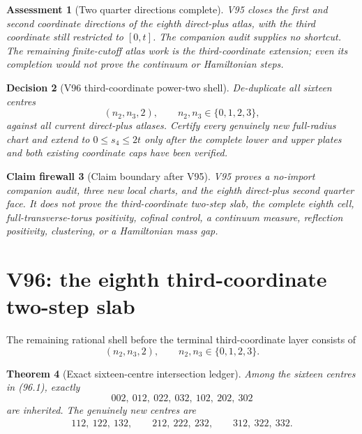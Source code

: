 \documentclass[11pt,oneside]{article}
\newtheorem{theorem}{Theorem}[section]
\newtheorem{assessment}[theorem]{Assessment}
\newtheorem{firewall}[theorem]{Claim firewall}
\newtheorem{decision}[theorem]{Decision}
\theoremstyle{definition}
\theoremstyle{remark}
\begin{document}
\begin{assessment}[Two quarter directions complete]
\label{ass:newv95}
V95 closes the first and second coordinate directions of the eighth
direct-plus atlas, with the third coordinate still restricted to
\([0,t]\).  The companion audit supplies no shortcut.  The remaining
finite-cutoff atlas work is the third-coordinate extension; even its
completion would not prove the continuum or Hamiltonian steps.
\end{assessment}

\begin{decision}[V96 third-coordinate power-two shell]
\label{dec:newv95-next}
De-duplicate all sixteen centres
\[
 (n_2,n_3,2),\qquad n_2,n_3\in\{0,1,2,3\},          \tag{95.12}
\]
against all current direct-plus atlases.  Certify every genuinely
new full-radius chart and extend to \(0\leq s_4\leq2t\) only after
the complete lower and upper plates and both existing coordinate
caps have been verified.
\end{decision}

\begin{firewall}[Claim boundary after V95]
\label{fire:newv95-final}
V95 proves a no-import companion audit, three new local charts, and
the eighth direct-plus second quarter face.  It does not prove the
third-coordinate two-step slab, the complete eighth cell,
full-transverse-torus positivity, cofinal control, a continuum
measure, reflection positivity, clustering, or a Hamiltonian mass
gap.
\end{firewall}

\section{V96: the eighth third-coordinate two-step slab}
\label{sec:newv96-eighth-third-two-step}

The remaining rational shell before the terminal third-coordinate
layer consists of
\[
 (n_2,n_3,2),\qquad n_2,n_3\in\{0,1,2,3\}.          \tag{96.1}
\]

\begin{theorem}[Exact sixteen-centre intersection ledger]
\label{thm:newv96-intersection}
Among the sixteen centres in (96.1), exactly
\[
 002,\ 012,\ 022,\ 032,\ 102,\ 202,\ 302             \tag{96.2}
\]
are inherited.  The genuinely new centres are
\[
\begin{gathered}
 112,\ 122,\ 132,\qquad
 212,\ 222,\ 232,\qquad
 312,\ 322,\ 332.                                    \tag{96.3}
\end{gathered}
\]
\end{theorem}
\end{document}
